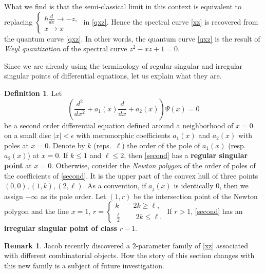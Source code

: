 \documentclass{amsart}
\theoremstyle{definition}
\newtheorem{Def}[thm]{Definition}
\newtheorem{rem}[thm]{Remark}
\numberwithin{equation}{section}
\numberwithin{figure}{section}
\newcommand{\lrar}{\longrightarrow}
\begin{document}
What we find is that the semi-classical limit
in this context is equivalent to replacing 
$
\begin{cases}
\hbar \frac{d}{dx} \lrar -z,\\
x\lrar x
\end{cases}
$
in \eqref{qxz}. 
Hence the spectral curve \eqref{xz} is recovered from the quantum curve
\eqref{qxz}. In other words, the quantum curve \eqref{qxz} is 
the result of \emph{Weyl quantization} of the spectral curve
$z^2-xz+1=0$.

Since we are already using the terminology of regular singular and
irregular singular points of
differential equations, let us  explain what they are. 

\begin{Def}
\label{regular and irregular} 
Let
\begin{equation}
\label{second}
\left(\frac{d^2}{dx^2}+a_1(x)\frac{d}{dx}+a_2(x)
\right)\Psi(x) = 0
\end{equation}
be a second order differential equation
defined around a neighborhood of $x=0$ on a
small disc $|x|< \epsilon$ with meromorphic 
coefficients $a_1(x)$ and $a_2(x)$ with poles  
at $x=0$. Denote by $k$ (reps.\ $\ell$) the 
order of the pole of 
$a_1(x)$ (resp.\ $a_2(x)$) at $x=0$. 
If $k \le 1$  and $\ell\le 2$, then \eqref{second}
has a \textbf{regular singular point} at $x=0$.
Otherwise, consider the \emph{Newton polygon}
 of the order of poles of the coefficients of
 \eqref{second}. It is the upper part of
 the convex hull of three
 points $(0,0), (1, k), (2,\ell)$. As a convention,
 if $a_j(x)$ is identically $0$, then
 we assign $-\infty$ as its pole order. Let $(1,r)$
 be the intersection point of
 the Newton polygon and the line $x=1$,
$
r= \begin{cases}
 k \qquad 2k\ge \ell,\\
\frac{\ell}{2} \qquad 2k\le \ell.
 \end{cases}
$
 If $r>1$, \eqref{second} 
 has an \textbf{irregular singular point of class}
 $r-1$. 
 \end{Def}
\begin{rem}
Jacob \cite{CJ} recently discovered a $2$-parameter family of \eqref{xz}
associated with different combinatorial objects. How the story of this section
changes with this new family is a subject of future investigation. 
\end{rem}
\end{document}
